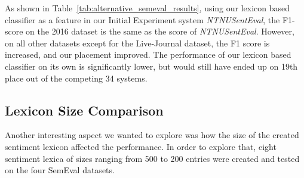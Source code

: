 \begin{table}[H]
    \centering
    \caption[Alternative SemEval 2016 results]{Alternative F1-scores and accuracy results for SemEval 2016 if we had submitted different systems instead. Ordered by F1-scores on the 2016 dataset.}
    \label{tab:alternative_semeval_results}
\end{table}

As shown in Table~\ref{tab:alternative_semeval_results}, using our lexicon based classifier as a feature in our Initial Experiment system \textit{NTNUSentEval}, the F1-score on the 2016 dataset is the same as the score of \textit{NTNUSentEval}. However, on all other datasets except for the Live-Journal dataset, the F1 score is increased, and our placement improved. The performance of our lexicon based classifier on its own is significantly lower, but would still have ended up on 19th place out of the competing 34 systems. 

\subsection{Lexicon Size Comparison}
\label{sec:lexicon_size_comparison}
Another interesting aspect we wanted to explore was how the size of the created sentiment lexicon affected the performance. In order to explore that, eight sentiment lexica of sizes ranging from 500 to 200 entries were created and tested on the four SemEval datasets. \\

